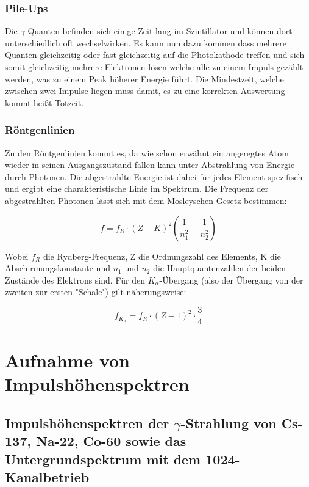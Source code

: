 \documentclass[a4paper,titlepage]{scrartcl}
\numberwithin{equation}{section}
\begin{document}
\subsubsection{Pile-Ups}

Die $\gamma $-Quanten befinden sich einige Zeit lang im Szintillator und können dort unterschiedlich oft wechselwirken. Es kann nun dazu kommen dass mehrere Quanten gleichzeitig oder fast gleichzeitig auf die Photokathode treffen und sich somit gleichzeitig mehrere Elektronen lösen welche alle zu einem Impuls gezählt werden, was zu einem Peak höherer Energie führt. Die Mindestzeit, welche zwischen zwei Impulse liegen muss damit, es zu eine korrekten Auswertung kommt heißt Totzeit.

\subsubsection{Röntgenlinien}

Zu den Röntgenlinien kommt es, da wie schon erwähnt ein angeregtes Atom wieder in seinen Ausgangszustand fallen kann unter Abstrahlung von Energie durch Photonen. Die abgestrahlte Energie ist dabei für jedes Element spezifisch und ergibt eine charakteristische Linie im Spektrum. Die Frequenz der abgestrahlten Photonen lässt sich mit dem Mosleyschen Gesetz bestimmen:

\begin{equation*}
f= f_R \cdot \left( Z - K \right)^2 \left( \frac{1}{n_1^2} - \frac{1}{n_2^2}\right)
\end{equation*}

Wobei $f_R$ die Rydberg-Frequenz, Z die Ordnungszahl des Elements, K die Abschirmungskonstante und $n_1$ und $n_2$ die Hauptquantenzahlen der beiden Zustände des Elektrons sind. Für den $K_{\alpha}$-Übergang (also der Übergang von der zweiten zur ersten "Schale") gilt näherungsweise:

\begin{equation*}
f_{K_{\alpha}}= f_R \cdot \left( Z - 1 \right)^2 \cdot \frac{3}{4}
\end{equation*}

\section{Aufnahme von Impulshöhenspektren}
\subsection{Impulshöhenspektren der $\gamma$-Strahlung von Cs-137, Na-22, Co-60 sowie das Untergrundspektrum mit dem 1024-Kanalbetrieb}
\end{document}
